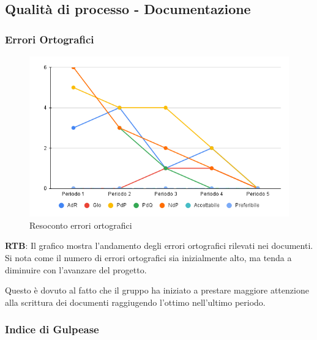 \subsection{Qualità di processo - Documentazione}

\vspace{0.3cm}

\subsubsection{Errori Ortografici}

\vspace{0.3cm}

\begin{figure}[H]
    \centering
    \includegraphics[width=1\textwidth]{../Images/PianoDiQualifica/errori_ortografici.png}
    \caption{Resoconto errori ortografici}
    \label{fig:Errori ortografici}
\end{figure}

\vspace{0.2cm}

\textbf{RTB}: Il grafico mostra l'andamento degli errori ortografici rilevati nei documenti. Si nota come il numero di errori ortografici sia inizialmente alto, ma tenda a diminuire con l'avanzare del progetto.

\vspace{0.2cm}

Questo è dovuto al fatto che il gruppo ha iniziato a prestare maggiore attenzione alla scrittura dei documenti raggiugendo l'ottimo nell'ultimo periodo.

\subsubsection{Indice di Gulpease}

